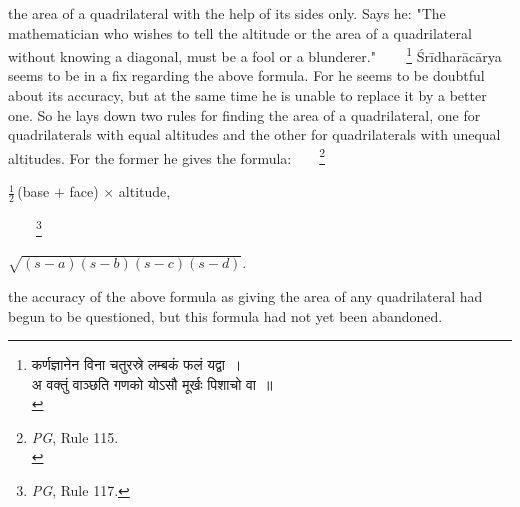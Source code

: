 \documentclass[10pt, openany]{book}
\begin{document}
{the area of a quadrilateral with the help of its sides only.}
{Says he: {\eqt "The mathematician who wishes to tell the altitude or the area of a quadrilateral without knowing a diagonal, must be a fool or a blunderer."}~~\,~~\renewcommand{\thefootnote}{\hspace{-4.5mm} 2}\footnote{\hspace{-2mm} {\qt कर्णज्ञानेन विना चतुरस्रे लम्बकं फलं यद्वा~। }\\

{\color{white}अ} \hspace{-3mm} {\qt वक्तुं वाञ्छति गणको योऽसौ मूर्खः पिशाचो वा~॥} \hspace{2mm} \\} Śrīdharācārya seems to be}
{in a fix regarding the above formula. For he seems to be}
{doubtful about its accuracy, but at the same time he is unable}
{to replace it by a better one. So he lays down two rules for}
{finding the area of a quadrilateral, one for quadrilaterals with}
{equal altitudes and the other for quadrilaterals with unequal}
{altitudes. For the former he gives the formula:}~~~~\renewcommand{\thefootnote}{\hspace{-4.5mm} 3}\footnote{\hspace{-2mm} \englishfont \textit{PG}, Rule 115.\\} 

\begin{center}
    
{$\frac{1}{2}$}\,{(base $+$ face) $\times$ altitude, }\end{center}

~~~~\renewcommand{\thefootnote}{\hspace{-4.5mm} 4}\footnote{\hspace{-2mm} \englishfont \textit{PG}, Rule 117.}

\begin{center}
    
$\sqrt{(s-a) (s-b) (s-c) (s-d)}$. \end{center}

{the accuracy of the above formula as giving the area of any}
{quadrilateral had begun to be questioned, but this formula}
{had not yet been abandoned.}
\vspace{3mm}
\end{document}
